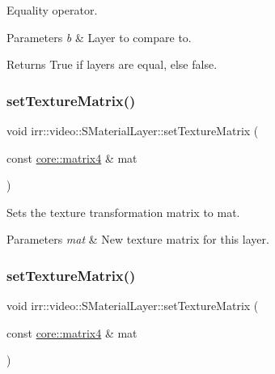Equality operator. 


\begin{DoxyParams}{Parameters}
{\em b} & Layer to compare to. \\
\hline
\end{DoxyParams}
\begin{DoxyReturn}{Returns}
True if layers are equal, else false. 
\end{DoxyReturn}
\mbox{\label{classirr_1_1video_1_1SMaterialLayer_a0f84f47351a17b2a6041688a425fda1a}} 
\subsubsection{\texorpdfstring{set\+Texture\+Matrix()}{setTextureMatrix()}\hspace{0.1cm}{\footnotesize\ttfamily [1/2]}}
{\footnotesize\ttfamily void irr\+::video\+::\+S\+Material\+Layer\+::set\+Texture\+Matrix (\begin{DoxyParamCaption}\item[{const \hyperlink{namespaceirr_1_1core_a4c9d4e29899535971052810954a14431}{core\+::matrix4} \&}]{mat }\end{DoxyParamCaption})\hspace{0.3cm}{\ttfamily [inline]}}



Sets the texture transformation matrix to mat. 


\begin{DoxyParams}{Parameters}
{\em mat} & New texture matrix for this layer. \\
\hline
\end{DoxyParams}
\mbox{\label{classirr_1_1video_1_1SMaterialLayer_a0f84f47351a17b2a6041688a425fda1a}} 
\subsubsection{\texorpdfstring{set\+Texture\+Matrix()}{setTextureMatrix()}\hspace{0.1cm}{\footnotesize\ttfamily [2/2]}}
{\footnotesize\ttfamily void irr\+::video\+::\+S\+Material\+Layer\+::set\+Texture\+Matrix (\begin{DoxyParamCaption}\item[{const \hyperlink{namespaceirr_1_1core_a4c9d4e29899535971052810954a14431}{core\+::matrix4} \&}]{mat }\end{DoxyParamCaption})\hspace{0.3cm}{\ttfamily [inline]}}



